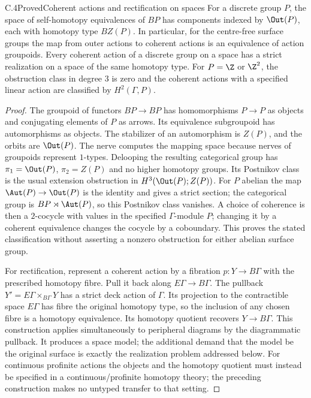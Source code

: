 \begin{claim}{C.4}{Proved}{Coherent actions and rectification on spaces}
For a discrete group $P$, the space of self-homotopy equivalences of
$BP$ has components indexed by $\Out(P)$, each with homotopy type
$BZ(P)$. In particular, for the centre-free surface groups the map from
outer actions to coherent actions is an equivalence of action groupoids.
Every coherent action of a discrete group on a space has a strict
realization on a space of the same homotopy type. For $P=\Z$ or $\Z^2$,
the obstruction class in degree $3$ is zero and the coherent actions
with a specified linear action are classified by $H^2(\Gamma,P)$.
\end{claim}
\begin{proof}
The groupoid of functors $BP\to BP$ has homomorphisms $P\to P$ as
objects and conjugating elements of $P$ as arrows. Its equivalence
subgroupoid has automorphisms as objects. The stabilizer of an
automorphism is $Z(P)$, and the orbits are $\Out(P)$. The nerve computes
the mapping space because nerves of groupoids represent $1$-types.
Delooping the resulting categorical group has $\pi_1=\Out(P)$,
$\pi_2=Z(P)$ and no higher homotopy groups. Its Postnikov class is the
usual extension obstruction in $H^3(\Out(P);Z(P))$. For $P$ abelian the
map $\Aut(P)\to\Out(P)$ is the identity and gives a strict section;
the categorical group is $BP\rtimes\Aut(P)$, so this Postnikov class
vanishes. A choice of coherence is then a $2$-cocycle with values in the
specified $\Gamma$-module $P$; changing it by a coherent equivalence
changes the cocycle by a coboundary. This proves the stated
classification without asserting a nonzero obstruction for either
abelian surface group.

For rectification, represent a coherent action by a fibration
$p:Y\to B\Gamma$ with the prescribed homotopy fibre. Pull it back along
$E\Gamma\to B\Gamma$. The pullback $Y'=E\Gamma\times_{B\Gamma}Y$ has a
strict deck action of $\Gamma$. Its projection to the contractible
space $E\Gamma$ has fibre the original homotopy type, so the inclusion
of any chosen fibre is a homotopy equivalence. Its homotopy quotient
recovers $Y\to B\Gamma$. This construction applies simultaneously to
peripheral diagrams by the diagrammatic pullback. It produces a space
model; the additional demand that the model be the original surface is
exactly the realization problem addressed below. For continuous
profinite actions the objects and the homotopy quotient must instead be
specified in a continuous/profinite homotopy theory; the preceding
construction makes no untyped transfer to that setting.
\end{proof}

